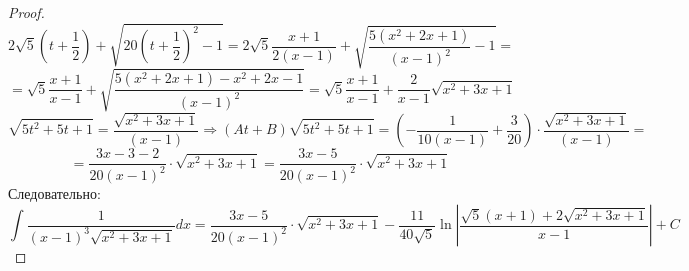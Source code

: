 \documentclass[12pt]{article}
\theoremstyle{definition}
\DeclareMathOperator{\dint}{\displaystyle\int}
\begin{document}
\begin{proof}
$$	$$
	$$
		2\sqrt{5}\left(t + \dfrac{1}{2}\right) + \sqrt{20\left(t + \dfrac{1}{2}\right)^2 - 1} = 2\sqrt{5}\dfrac{x +1}{2(x-1)} + \sqrt{\dfrac{5(x^2 + 2x + 1)}{(x-1)^2} - 1} = 
	$$
	$$
		= \sqrt{5}\dfrac{x +1}{x-1} + \sqrt{\dfrac{5(x^2 + 2x + 1) - x^2 + 2x -1}{(x-1)^2}} = \sqrt{5}\dfrac{x + 1}{x-1} + \dfrac{2}{x-1}\sqrt{x^2 + 3x + 1}
	$$
	$$
		\sqrt{5t^2 + 5t + 1} =\dfrac{\sqrt{x^2 + 3x + 1}}{(x-1)} \Rightarrow (At + B)\sqrt{5t^2 + 5t + 1} =  \left(-\dfrac{1}{10(x-1)} + \dfrac{3}{20}\right){\cdot} \dfrac{\sqrt{x^2 + 3x + 1}}{(x-1)} = 
	$$
	$$
		=	\dfrac{3x - 3 - 2}{20(x-1)^2}{\cdot}\sqrt{x^2 + 3x + 1} = \dfrac{3x - 5}{20(x-1)^2}{\cdot}\sqrt{x^2 + 3x + 1}
	$$
	Следовательно:
	$$
		\dint \dfrac{1}{(x-1)^3\sqrt{x^2 + 3x + 1}}dx = \dfrac{3x - 5}{20(x-1)^2}{\cdot}\sqrt{x^2 + 3x + 1} - \dfrac{11}{40\sqrt{5}}\ln{\left| \dfrac{\sqrt{5}(x+ 1) + 2\sqrt{x^2 + 3x +1}}{x-1}\right|} + C
	$$
\end{proof}
\end{document}
